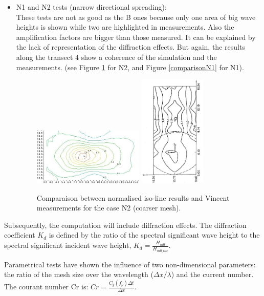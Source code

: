 \begin{itemize}
\item N1 and N2 tests (narrow directional spreading):\\
  These tests are not as good as the B ones because only one area of big wave
  heights is shown while two are highlighted in measurements. Also the
  amplification factors are bigger than those measured. It can be explained by
  the lack of representation of the diffraction effects. But again, the results
  along the transect 4 show a coherence of the simulation and the measurements.
  (see Figure \ref{comparisonN2} for N2, and Figure \ref{comparisonN1} for N1).
\begin{figure}[H]
  \centering
    \includegraphics[width=0.5\textwidth]{iso-N2.jpg}
    \includegraphics[width=0.3\textwidth,angle=-90]{N2-m.JPG}
      \caption{Comparaison between normalised iso-line \tomawac results and Vincent measurements for the case N2 (coarser mesh).}
\label {comparisonN2}
\end{figure}
\end{itemize}
Subsequently, the computation will include diffraction effects.
The diffraction coefficient $K_d$ is defined by the ratio of the spectral
significant wave height to the spectral significant incident wave height,
$K_d = \frac{H_{m0}}{H_{m0\_ inc}}$.

Parametrical tests have shown the influence of two non-dimensional parameters:
the ratio of the mesh size over the wavelength ($\Delta x / \lambda$) and the
current number.
The courant number Cr is: $Cr = \frac{C_g(f_p)\Delta t}{\Delta x}$.


